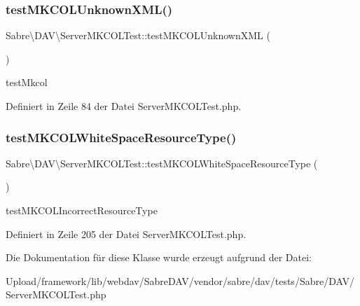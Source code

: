 \subsubsection{\texorpdfstring{test\+M\+K\+C\+O\+L\+Unknown\+X\+M\+L()}{testMKCOLUnknownXML()}}
{\footnotesize\ttfamily Sabre\textbackslash{}\+D\+A\+V\textbackslash{}\+Server\+M\+K\+C\+O\+L\+Test\+::test\+M\+K\+C\+O\+L\+Unknown\+X\+ML (\begin{DoxyParamCaption}{ }\end{DoxyParamCaption})}

test\+Mkcol 

Definiert in Zeile 84 der Datei Server\+M\+K\+C\+O\+L\+Test.\+php.

\mbox{\label{class_sabre_1_1_d_a_v_1_1_server_m_k_c_o_l_test_a3b0f3601eb25e55043eeac15a90c8cdf}} 
\subsubsection{\texorpdfstring{test\+M\+K\+C\+O\+L\+White\+Space\+Resource\+Type()}{testMKCOLWhiteSpaceResourceType()}}
{\footnotesize\ttfamily Sabre\textbackslash{}\+D\+A\+V\textbackslash{}\+Server\+M\+K\+C\+O\+L\+Test\+::test\+M\+K\+C\+O\+L\+White\+Space\+Resource\+Type (\begin{DoxyParamCaption}{ }\end{DoxyParamCaption})}

test\+M\+K\+C\+O\+L\+Incorrect\+Resource\+Type 

Definiert in Zeile 205 der Datei Server\+M\+K\+C\+O\+L\+Test.\+php.



Die Dokumentation für diese Klasse wurde erzeugt aufgrund der Datei\+:\begin{DoxyCompactItemize}
\item 
Upload/framework/lib/webdav/\+Sabre\+D\+A\+V/vendor/sabre/dav/tests/\+Sabre/\+D\+A\+V/Server\+M\+K\+C\+O\+L\+Test.\+php\end{DoxyCompactItemize}
